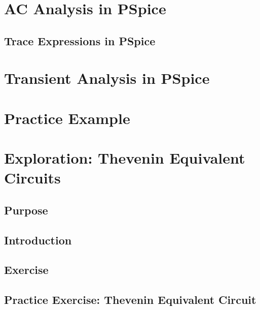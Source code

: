 \documentclass[12pt]{../manual}
\begin{document}
\section{AC Analysis in PSpice}

\subsection{Trace Expressions in PSpice}

\section{Transient Analysis in PSpice}

\section{Practice Example}

\section{Exploration: Thevenin Equivalent Circuits}
\subsection{Purpose}
\subsection{Introduction}
\subsection{Exercise}
\subsection{Practice Exercise: Thevenin Equivalent Circuit}

\newpage
{} %
\end{document}
